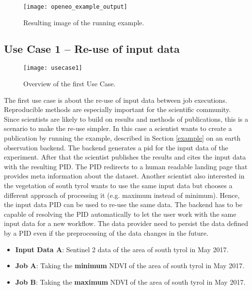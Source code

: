 \documentclass[draft,final]{vutinfth} %
\begin{document}
\begin{figure}[h]
	\centering
	\texttt{[image: openeo\_example\_output]}
	\caption{Resulting image of the running example.}
	\label{fig:example} %
\end{figure}


\subsection{Use Case 1 – Re-use of input data}\label{UseCase1}
\begin{figure}[h]
	\centering
	\texttt{[image: usecase1]}
	\caption{Overview of the first Use Case.}
	\label{fig:usecase1} %
\end{figure}
The first use case is about the re-use of input data between job executions. Reproducible methods are especially important for the scientific community. Since scientists are likely to build on results and methods of publications, this is a scenario to make the re-use simpler. In this case a scientist wants to create a publication by running the example, described in Section \ref{example} on an earth observation backend. The backend generates a \gls{pid} for the input data of the experiment. After that the scientist publishes the results and cites the input data with the resulting PID. The PID redirects to a human readable landing page that provides meta information about the dataset. Another scientist also interested in the vegetation of south tyrol wants to use the same input data but chooses a different approach of processing it (e.g. maximum instead of minimum). Hence, the input data PID can be used to re-use the same data. The backend has to be capable of resolving the PID automatically to let the user work with the same input data for a new workflow. The data provider need to persist the data defined by a PID even if the preprocessing of the data changes in the future.    

\begin{itemize}
	\item \textbf{Input Data A}: Sentinel 2 data of the area of south tyrol in May 2017. 
	\item \textbf{Job A}: Taking the \textbf{minimum} NDVI of the area of south tyrol in May 2017. 
	\item \textbf{Job B}: Taking the \textbf{maximum} NDVI of the area of south tyrol in May 2017.
\end{itemize}
\end{document}
